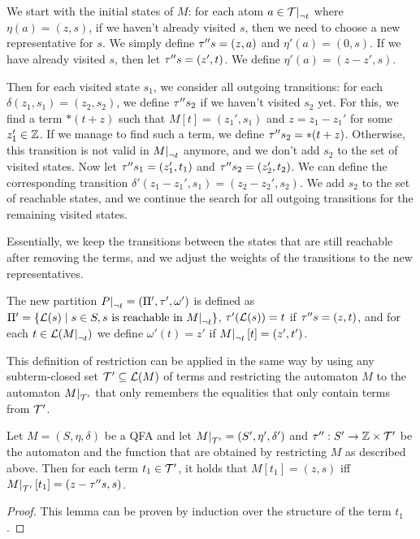 We start with the initial states of $M$:
for each atom $a \in \restr{\T}{\neg t}$ where $\eta(a) = (z, s)$, if we haven't already visited $s$, then we need to choose a new representative for $s$. We simply define $\tau'' s = (z, a)$ and $\eta'(a) = (0, s)$.
If we have already visited $s$, then let $\tau'' s = (z', t)$. We define $\eta'(a) = (z - z', s)$.

Then for each visited state $s_1$, we consider all outgoing transitions: for each $\delta(z_1, s_1) = (z_2, s_2)$,
we define $\tau'' s_2$ if we haven't visited $s_2$ yet.
For this, we find a term $*(t+z)$ such that $M[t] = (z_1', s_1)$ and $z = z_1 - z_1'$ for some $z_1' \in \mathbb{Z}$.
If we manage to find such a term, we define $\tau'' s_2 = *(t+z)$.
Otherwise, this transition is not valid in $\restr{M}{\neg t}$ anymore, and we don't add $s_2$ to the set of visited states.
Now let $\tau'' s_1 = (z_1', t_1)$ and $\tau'' s_2 = (z_2', t_2)$.
We can define the corresponding transition $\delta'(z_1 - z_1', s_1) = (z_2 - z_2', s_2)$.
We add $s_2$ to the set of reachable states, and we continue the search for all outgoing transitions for the remaining visited states.

Essentially, we keep the transitions between the states that are still reachable after removing the terms, and we adjust the weights of the transitions to the new representatives.

The new partition $\restr{P}{\neg t} = (\Pi', \tau', \omega')$ is defined as $\Pi' = \{\L(s) \mid s \in S, s \text{ is reachable in $\restr{M}{\neg t}$}\}$,
$\tau' (\mathcal{L}(s)) = t$ if $\tau'' s = (z, t)$, and
for each $t \in \L(\restr{M}{\neg t})$ we define $\omega'(t) = z'$ if $\restr{M}{\neg t}[t] = (z', t')$.

This definition of restriction can be applied in the same way by using any subterm-closed set $\mathcal{T}' \subseteq \mathcal{L}(M)$ of terms and restricting the automaton $M$ to the automaton $\restr{M}{\T'}$ that only remembers the equalities that only contain terms from $\mathcal{T}'$.

\begin{lemma}\label{restriction}
    Let $M = (S, \eta, \delta)$ be a QFA and let $\restr{M}{\T'} = (S', \eta', \delta')$ and $\tau'' : S' \rightarrow \mathbb{Z} \times \mathcal{T}'$ be the automaton and the function that are obtained by restricting $M$ as described above.
    Then for each term $t_1 \in \mathcal{T}'$, it holds that $M[t_1] = (z, s)$ iff $\restr{M}{\T'}[t_1] = (z - \repr s, s)$.
\end{lemma}
\begin{proof}
    This lemma can be proven by induction over the structure of the term $t_1$.
\end{proof}

